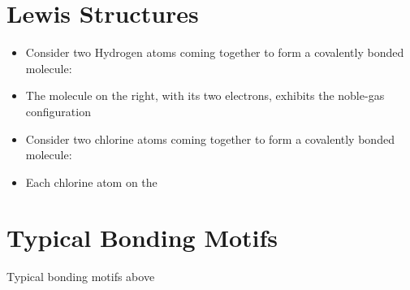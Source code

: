 \documentclass[
	chapter=9,
	title={Basic Concepts of Chemical Bonding},
	showanswers=true,
]{chem122notes}
\begin{document}
\section{Lewis Structures}\label{sec:lewis-structures}
\begin{itemize}
	\item Consider two Hydrogen atoms coming together to form a covalently bonded  molecule:
	\item The  molecule on the right, with its two electrons, exhibits the noble-gas configuration
	\item Consider two chlorine atoms coming together to form a covalently bonded  molecule:
	\item Each chlorine atom on the
\end{itemize}

\section{Typical Bonding Motifs}\label{sec:typical-bonding-motifs}
Typical bonding motifs above
\end{document}
